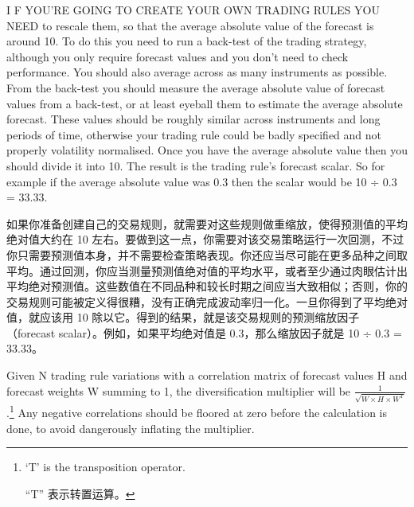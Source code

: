 

\begin{englishblock} I F YOU'RE GOING TO CREATE YOUR OWN TRADING RULES YOU NEED to rescale them, so that the average absolute value of the forecast is around 10. To do this you need to run a back-test of the trading strategy, although you only require forecast values and you don't need to check performance. You should also average across as many instruments as possible. From the back-test you should measure the average absolute value of forecast values from a back-test, or at least eyeball them to estimate the average absolute forecast. These values should be roughly similar across instruments and long periods of time, otherwise your trading rule could be badly specified and not properly volatility normalised. Once you have the average absolute value then you should divide it into 10. The result is the trading rule's forecast scalar. So for example if the average absolute value was 0.3 then the scalar would be 10 ÷ 0.3 = 33.33. \end{englishblock}

\begin{chineseblock}如果你准备创建自己的交易规则，就需要对这些规则做重缩放，使得预测值的平均绝对值大约在 10 左右。要做到这一点，你需要对该交易策略运行一次回测，不过你只需要预测值本身，并不需要检查策略表现。你还应当尽可能在更多品种之间取平均。通过回测，你应当测量预测值绝对值的平均水平，或者至少通过肉眼估计出平均绝对预测值。这些数值在不同品种和较长时期之间应当大致相似；否则，你的交易规则可能被定义得很糟，没有正确完成波动率归一化。一旦你得到了平均绝对值，就应该用 10 除以它。得到的结果，就是该交易规则的预测缩放因子（forecast scalar）。例如，如果平均绝对值是 0.3，那么缩放因子就是 10 ÷ 0.3 = 33.33。 \end{chineseblock}



\begin{englishblock} Given N trading rule variations with a correlation matrix of forecast values H and forecast weights W summing to 1, the diversification multiplier will be \(\frac{1}{\sqrt{W \times H \times W^T}}\).\footnote{‘T' is the transposition operator. \par “T” 表示转置运算。} Any negative correlations should be floored at zero before the calculation is done, to avoid dangerously inflating the multiplier. \end{englishblock}

